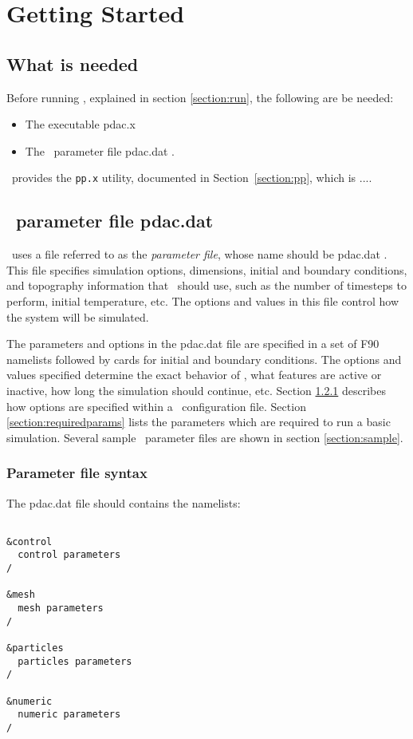 
\section{Getting Started}
\label{section:start}

\subsection{What is needed}

Before running \PDAC, explained in section \ref{section:run}, 
the following are be needed:
\begin{itemize}
\item The \PDAC executable pdac.x
\item The \PDAC\ parameter file pdac.dat .
\end{itemize}

\PDAC\ provides the \verb#pp.x# utility,
documented in Section~\ref{section:pp},
which is ....

\subsection{\PDAC\ parameter file pdac.dat}
\label{section:config}

\PDAC\ uses a file referred to as the {\it parameter file\/},
whose name should be pdac.dat .
This file specifies simulation options, dimensions, initial
and boundary conditions, and topography information that 
\PDAC\ should use, such as the number of timesteps to perform, 
initial temperature, etc.  
The options and values in this file control how 
the system will be simulated.  

The parameters and options in the pdac.dat file are specified 
in a set of F90 namelists followed by cards for initial and boundary
conditions.  
The options and values specified determine the exact behavior of
\PDAC, what features are active or inactive, how long the simulation
should continue, etc.  Section \ref{section:configsyntax} describes how
options are specified within a \PDAC\ configuration file.  Section
\ref{section:requiredparams} lists the parameters which are required
to run a basic simulation.  
Several sample \PDAC\ parameter files are shown
in section \ref{section:sample}.


\subsubsection{Parameter file syntax}
\label{section:configsyntax}
The pdac.dat file should contains the namelists:
\begin{verbatim}

&control
  control parameters
/

&mesh
  mesh parameters
/

&particles
  particles parameters
/

&numeric
  numeric parameters
/
\end{verbatim}

